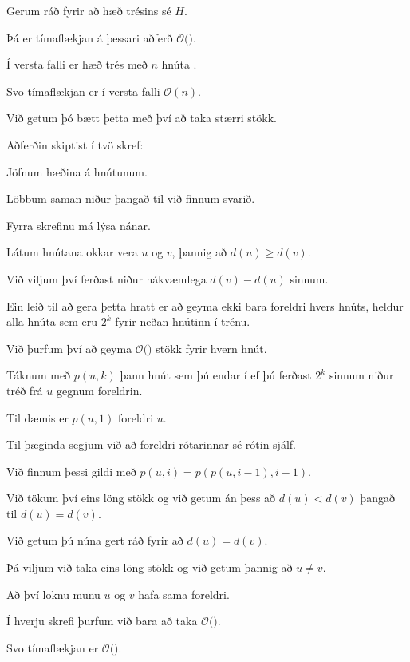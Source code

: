 {
}

{
	{
		\item<1-> Gerum ráð fyrir að hæð trésins sé $H$.
		\item<2-> Þá er tímaflækjan á þessari aðferð $\mathcal{O}($\onslide<3->{$\,H\,$}$)$.
		\item<4-> Í versta falli er hæð trés með $n$ hnúta \onslide<5->{$n - 1$}.
		\item<6-> Svo tímaflækjan er í versta falli $\mathcal{O}(n)$.
		\item<7-> Við getum þó bætt þetta með því að taka stærri stökk.
	}
}

{
	{
		\item<1-> Aðferðin skiptist í tvö skref:
		{
			\item<2-> Jöfnum hæðina á hnútunum.
			\item<3-> Löbbum saman niður þangað til við finnum svarið.
		}
		\item<4-> Fyrra skrefinu má lýsa nánar.
		\item<5-> Látum hnútana okkar vera $u$ og $v$, þannig að $d(u) \geq d(v)$.
		\item<6-> Við viljum því ferðast niður nákvæmlega $d(v) - d(u)$ sinnum.
		\item<7-> Ein leið til að gera þetta hratt er að geyma ekki bara foreldri hvers hnúts,
					heldur alla hnúta sem eru $2^k$ fyrir neðan hnútinn í trénu.
		\item<8-> Við þurfum því að geyma $\mathcal{O}($$)$ stökk fyrir hvern hnút.
		\item<10-> Táknum með $p(u, k)$ þann hnút sem þú endar í ef þú ferðast $2^k$ sinnum niður tréð frá $u$ gegnum foreldrin.
		\item<11-> Til dæmis er $p(u, 1)$ foreldri $u$.
		\item<12-> Til þæginda segjum við að foreldri rótarinnar sé rótin sjálf.
		\item<13-> Við finnum þessi gildi með $p(u, i) = p(p(u, i - 1), i - 1)$.
	}
}

{
	{
		\item<1-> Við tökum því eins löng stökk og við getum án þess að $d(u) < d(v)$ þangað til $d(u) = d(v)$.
		\item<2-> Við getum þú núna gert ráð fyrir að $d(u) = d(v)$.
		\item<3-> Þá viljum við taka eins löng stökk og við getum þannig að $u \neq v$.
		\item<4-> Að því loknu munu $u$ og $v$ hafa sama foreldri.
	}
}

{
}

{
	{
		\item<1-> Í hverju skrefi þurfum við bara að taka $\mathcal{O}($\onslide<2->{$\log n$}$)$.
		\item<3-> Svo tímaflækjan er $\mathcal{O}($\onslide<4->{$\log n$}$)$.
	}
}

{
}


